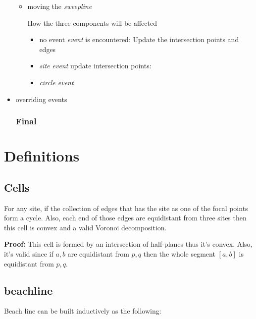 \documentclass{article}
\begin{document}
\begin{itemize}
\begin{displayquote}
\begin{itemize}
            \item moving the  {\it{sweepline}}  
              \begin{displayquote}
                How the three components will be affected
                \begin{itemize}
                    \item no event {\textit{event}} is encountered:
                    Update the intersection points and edges
                    \item {\textit{site event}} update intersection points:
                    \item {\textit{circle event}} 
                    
                \end{itemize}
                
              \end{displayquote}
            \end{itemize}
            \end{displayquote}
    \item overriding events 
   
   \subsubsection{{\color{black} Final}}
 
    \end{itemize}
    


\section{Definitions}

\subsection{Cells} For any site, if the collection of edges that has the site as one of the focal points form a cycle. Also, each end of those edges are equidistant from three sites then this cell is convex and a valid Voronoi decomposition.

\textbf{Proof:}
    This cell is formed by an intersection of half-planes thus it's convex. Also, it's valid since if $a, b$ are equidistant from $p, q$ then the whole segment $[a, b]$ is equidistant  from $p, q$. %

\subsection{beachline}
Beach line can be built inductively as the following:
 
\end{document}
